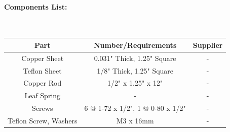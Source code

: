\documentclass[12pt]{report}
\begin{document}
\paragraph{Components List:} \hspace{1cm} \\
\begin{tabular}{c|c|c}
Part & Number/Requirements & Supplier\\
\hline
Copper Sheet & 0.031" Thick, 1.25" Square & -\\
Teflon Sheet & 1/8" Thick, 1.25" Square & -\\
Copper Rod & 1/2" x 1.25" x 12" & -\\
Leaf Spring & - & -\\
Screws & 6 @ 1-72 x 1/2", 1 @ 0-80 x 1/2" & -\\
Teflon Screw, Washers & M3 x 16mm & -\\

\end{tabular}
\end{document}
